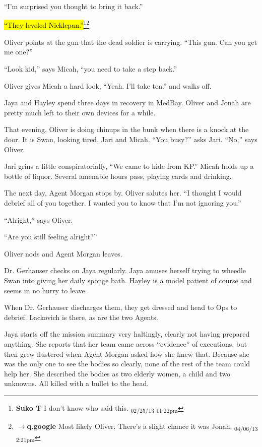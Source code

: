 ``I'm surprised you thought to bring it back.''

\hl{``They leveled Nicklepan.''}\footnote{\textbf{Suko T }I don't know who said this. \textsubscript{02/25/13 11:22pm}}\footnote{$\rightarrow$\textbf{q.google }Most likely Oliver.  There's a slight chance it was Jonah. \textsubscript{04/06/13 2:21pm}}

Oliver points at the gun that the dead soldier is carrying.  ``This gun.  Can you get me one?''

``Look kid,'' says Micah, ``you need to take a step back.''

Oliver gives Micah a hard look, ``Yeah.  I'll take ten.'' and walks off.



Jaya and Hayley spend three days in recovery in MedBay.  Oliver and Jonah are pretty much left to their own devices for a while.



That evening, Oliver is doing chinups in the bunk when there is a knock at the door.  It is Swan, looking tired, Jari and Micah.  ``You busy?'' asks Jari.  ``No,'' says Oliver.

Jari grins a little conspiratorially, ``We came to hide from KP.''  Micah holds up a bottle of liquor.  Several amenable hours pass, playing cards and drinking.



The next day, Agent Morgan stops by.  Oliver salutes her.  ``I thought I would debrief all of you together.  I wanted you to know that I'm not ignoring you.''

``Alright,'' says Oliver.

``Are you still feeling alright?''

Oliver nods and Agent Morgan leaves.

Dr. Gerhauser checks on Jaya regularly.  Jaya amuses herself trying to wheedle Swan into giving her daily sponge bath.  Hayley is a model patient of course and seems in no hurry to leave.



When Dr. Gerhauser discharges them, they get dressed and head to Ops to debrief.  Lackovich is there, as are the two Agents.



Jaya starts off the mission summary very haltingly, clearly not having prepared anything.  She reports that her team came across ``evidence'' of executions, but then grew flustered when Agent Morgan asked how she knew that.  Because she was the only one to see the bodies so clearly, none of the rest of the team could help her.  She described the bodies as two elderly women, a child and two unknowns.  All killed with a bullet to the head.



